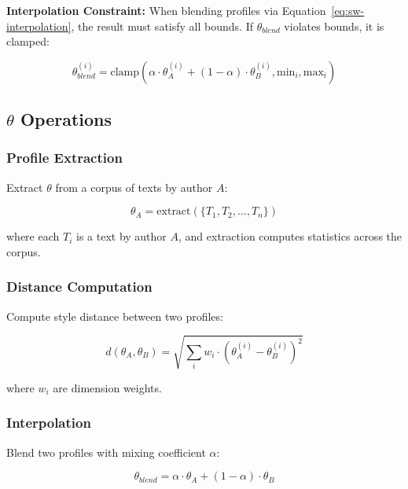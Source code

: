 \textbf{Interpolation Constraint:} When blending profiles via Equation~\ref{eq:sw-interpolation}, the result must satisfy all bounds. If $\theta_{blend}$ violates bounds, it is clamped:

\begin{equation}
\theta_{blend}^{(i)} = \text{clamp}(\alpha \cdot \theta_A^{(i)} + (1-\alpha) \cdot \theta_B^{(i)}, \text{min}_i, \text{max}_i)
\end{equation}

\subsection{$\theta$ Operations}
\label{sec:sw-theta-operations}

\subsubsection{Profile Extraction}

Extract $\theta$ from a corpus of texts by author $A$:

\begin{equation}
\theta_A = \text{extract}(\{T_1, T_2, ..., T_n\})
\end{equation}

where each $T_i$ is a text by author $A$, and extraction computes statistics across the corpus.

\subsubsection{Distance Computation}

Compute style distance between two profiles:

\begin{equation}
\label{eq:sw-distance}
d(\theta_A, \theta_B) = \sqrt{\sum_{i} w_i \cdot (\theta_A^{(i)} - \theta_B^{(i)})^2}
\end{equation}

where $w_i$ are dimension weights.

\subsubsection{Interpolation}

Blend two profiles with mixing coefficient $\alpha$:

\begin{equation}
\label{eq:sw-interpolation}
\theta_{blend} = \alpha \cdot \theta_A + (1-\alpha) \cdot \theta_B
\end{equation}

